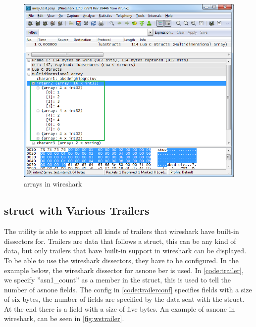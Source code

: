 \begin{figure}[htb]
	\center
	\includegraphics[width=\textwidth]{./sprints/img/wireshark_array}
	\caption{\Glspl{array} in \Gls{wireshark}\label{fig:wsarray}}
\end{figure}

\subsection{\Gls{struct} with Various Trailers}
The \gls{utility} is able to support all kinds of \gls{trailers} that \Gls{wireshark} have 
built-in \glspl{dissector} for. Trailers are data that follows a \gls{struct}, this can be 
any kind of data, but only trailers that have built-in support in \Gls{wireshark} can 
be displayed.  To be able to use the \Gls{wireshark} \glspl{dissector}, they have to be 
configured. In the example below, the \Gls{wireshark} \gls{dissector} for \gls{asnone} 
\gls{ber} is used.  In \autoref{code:trailer}, we 
specify ''asn1\_count'' as a \gls{member} in the \gls{struct}, this is used to tell the 
number of \gls{asnone} fields. The config in  \autoref{code:trailerconf} specifies 
fields with a size of six bytes, the number of fields are specified by the data 
sent with the \gls{struct}. At the end there is a field with a size of five bytes. An 
example of \gls{asnone} in \Gls{wireshark}, can be seen in \autoref{fig:wstrailer}.

